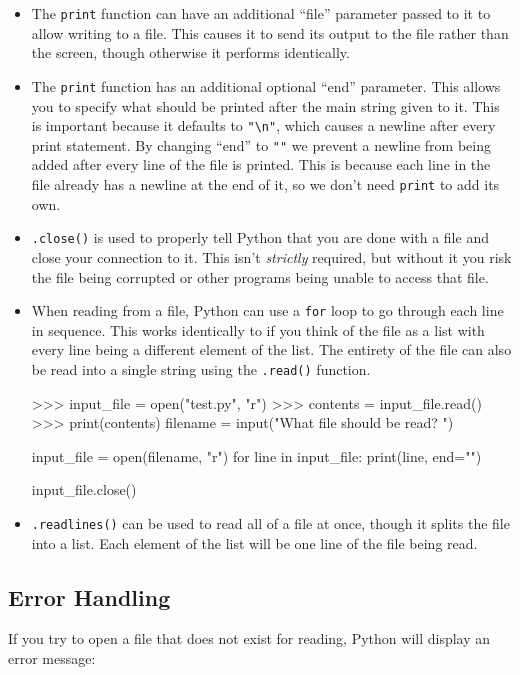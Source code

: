 \documentclass[11pt]{cselabheader}
\begin{document}
\begin{itemize}
\item The \lstinline{print} function can have an additional ``file'' parameter
  passed to it to allow writing to a file. This causes it to send its output to
  the file rather than the screen, though otherwise it performs identically.

\item The \lstinline{print} function has an additional optional ``end''
  parameter. This allows you to specify what should be printed after the main
  string given to it. This is important because it defaults to \lstinline{"\n"},
  which causes a newline after every print statement. By changing ``end'' to
  \lstinline{""} we prevent a newline from being added after every line of the
  file is printed. This is because each line in the file already has a newline
  at the end of it, so we don't need \lstinline{print} to add its own.

\item \lstinline{.close()} is used to properly tell Python that you are done
  with a file and close your connection to it. This isn't \emph{strictly}
  required, but without it you risk the file being corrupted or other programs
  being unable to access that file.

\item When reading from a file, Python can use a \lstinline{for} loop to go
  through each line in sequence. This works identically to if you think of the
  file as a list with every line being a different element of the list. The
  entirety of the file can also be read into a single string using the
  \lstinline{.read()} function.

\begin{pyconcode}
>>> input_file = open("test.py", "r")
>>> contents = input_file.read()
>>> print(contents)
filename = input("What file should be read? ")

input_file = open(filename, "r")
for line in input_file:
  print(line, end="")

input_file.close()
\end{pyconcode}

\item \lstinline{.readlines()} can be used to read all of a file at once, though
  it splits the file into a list. Each element of the list will be one line of
  the file being read.
\end{itemize}


\subsection{Error Handling}
If you try to open a file that does not exist for reading, Python will display
an error message:
\end{document}
